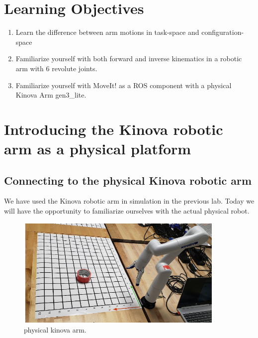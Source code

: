 \documentclass[12pt]{article}
\begin{document}
	\MakeScribeTop


\section{Learning Objectives}
\begin{enumerate}
    \item Learn the difference between arm motions in task-space and configuration-space
    
    \item Familiarize yourself with both forward and inverse kinematics in a robotic arm with 6 revolute joints.
    
    \item Familiarize yourself with MoveIt! as a ROS component with a physical Kinova Arm gen3\_lite.
\end{enumerate}


\section{Introducing the Kinova robotic arm as a physical platform
}
\subsection{Connecting to the physical Kinova robotic arm}
We have used the Kinova robotic arm in simulation in the previous lab. Today we will have the opportunity to familiarize ourselves with the actual physical robot. 

\begin{figure}[H]
    \vspace{-10pt}
    \centering\includegraphics[width=10cm]{images/kinova.PNG}\vspace{-10pt}
    \caption{physical kinova arm.}\label{fig:gazebo}
    \end{figure}
\end{document}
